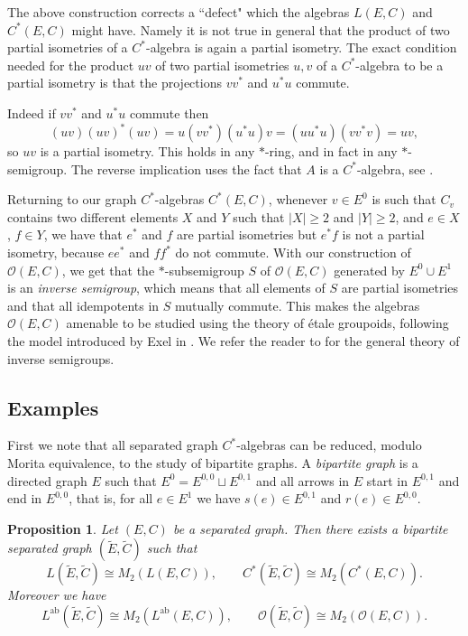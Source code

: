 \documentclass[11pt]{amsart}
\newcommand{\Lab}{L^{{\mathrm{ab}}}}
\theoremstyle{plain}            %
\newtheorem{proposition}[theorem]{Proposition}
\theoremstyle{definition}       %
\theoremstyle{definition}       %
\theoremstyle{remark}
\begin{document}
The above construction corrects a ``defect" which the algebras $L(E,C)$ and $C^*(E,C)$ might have. Namely it is not true in general that the product of two partial isometries of a $C^*$-algebra is again a partial isometry. The exact condition needed for the product $uv$ of two partial isometries $u,v$ of a $C^*$-algebra to be a partial isometry is that the projections $vv^*$ and $u^*u$ commute.

Indeed if $vv^*$ and $u^*u$ commute then
$$(uv)(uv)^* (uv) = u(vv^*)(u^*u)v = (uu^*u)(vv^*v) = uv,$$
so $uv$ is a partial isometry. This holds in any $*$-ring, and in fact in any $*$-semigroup.
The reverse implication uses the fact that $A$ is a $C^*$-algebra, see \cite[Proposition 12.8]{ExelBook}.

Returning to our graph $C^*$-algebras $C^*(E,C)$, whenever $v\in E^0$ is such that $C_v$ contains two different elements $X$ and $Y$ such that $|X|\ge 2$ and $|Y|\ge 2$, and $e\in X$, $f\in Y$, we have that 
$e^*$ and $f$ are partial isometries but $e^*f$ is not a partial isometry, because $ee^*$ and $ff^*$ do not commute. With our construction of $\mathcal O (E,C)$, we get that the $*$-subsemigroup $S$ of $\mathcal O (E,C)$ generated by $E^0\cup E^1$ is an {\it inverse semigroup}, which means that all elements of $S$ are partial isometries and that all idempotents in $S$ mutually commute. This makes the algebras $\mathcal O (E,C)$ amenable to be studied using the theory of étale groupoids, following the model introduced by Exel in \cite{Exel08}. We refer the reader to \cite{law} for the general theory of inverse semigroups.    



\subsection{Examples}

First we note that all separated graph $C^*$-algebras can be reduced, modulo Morita equivalence, to the study of bipartite graphs. A {\it bipartite graph} is a directed graph $E$ such that $E^0= E^{0,0} \sqcup E^{0,1}$ and all arrows in $E$ start in $E^{0,1}$ and end in $E^{0,0}$, that is, for all $e\in E^1$ we have 
$s(e)\in E^{0,1}$ and $r(e)\in E^{0,0}$. 

\begin{proposition} {\rm \cite[Proposition 9.1]{ae14}}
	\label{prop:reductiontobipartitegraphs} Let $(E,C)$ be a separated
	graph. Then there exists a bipartite separated graph
	$(\widetilde{E},\widetilde{C})$ such that
	$$L(\widetilde{E},\widetilde{C}) \cong  M_2(L(E,C)),\qquad
	C^*(\widetilde{E},\widetilde{C}) \cong M_2(C^*(E,C)).$$  Moreover we
	have
	$$\Lab (\widetilde{E}, \widetilde{C}) \cong M_2(\Lab
	(E,C)),\qquad \mathcal O (\widetilde{E}, \widetilde{C})\cong
	M_2(\mathcal O (E,C)) .$$
\end{proposition}
\end{document}

